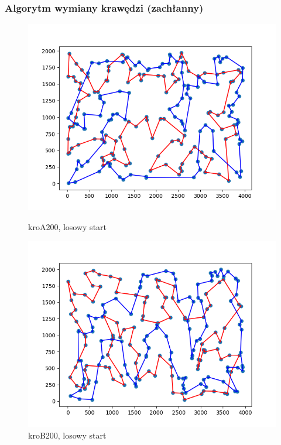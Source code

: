 \documentclass[11pt]{article}
\begin{document}
\subsubsection{Algorytm wymiany krawędzi (zachłanny)}
\begin{figure}[H]
    \centering
    \begin{minipage}[t]{0.45\textwidth}
        \centering
        \includegraphics[width=\linewidth]{best_paths/kroA200/traverse_greedy_edge/randomstart}
        \caption{kroA200, losowy start}
    \end{minipage}
    \hfill
    \begin{minipage}[t]{0.45\textwidth}
        \centering
        \includegraphics[width=\linewidth]{best_paths/kroB200/traverse_greedy_edge/randomstart}
        \caption{kroB200, losowy start}
    \end{minipage}


\end{figure}
\end{document}
